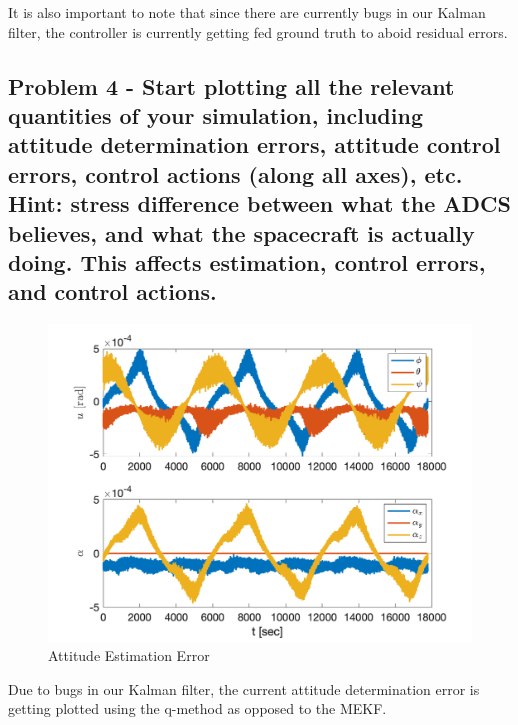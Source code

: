 It is also important to note that since there are currently bugs in our Kalman filter, the controller is currently getting fed ground truth to aboid residual errors.


\subsection{Problem 4 - Start plotting all the relevant quantities of your simulation, including attitude determination errors, attitude control errors, control actions (along all axes), etc. Hint: stress difference between what the ADCS believes, and what the spacecraft is actually doing. This affects estimation, control errors, and control actions.}

\begin{figure}[H]
    \centering
    \captionsetup{ justification = centering }
    \includegraphics[width = 15cm]{Images/PS9/attitude_estimate_error.png}
    \caption{Attitude Estimation Error}
    \label{fig:attitudeEstimationError}
\end{figure}

Due to bugs in our Kalman filter, the current attitude determination error is getting plotted using the q-method as opposed to the MEKF.

